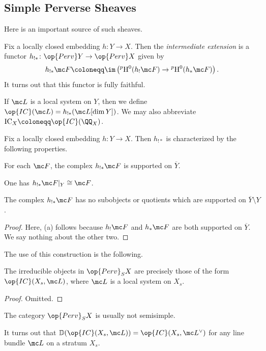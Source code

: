 \documentclass{article}
\begin{document}
\subsection{Simple Perverse Sheaves}
Here is an important source of such sheaves.
\begin{definition}
	Fix a locally closed embedding $h\colon Y\to X$. Then the \textit{intermediate extension} is a functor $h_{!*}\colon\op{Perv}Y\to\op{Perv}X$ given by
	\[h_{!*}\mc F\coloneqq\im\left({^p\mathrm H^0}(h_!\mc F)\to{^p\mathrm H^0}(h_*\mc F)\right).\]
	It turns out that this functor is fully faithful.
\end{definition}
\begin{example}
	If $\mc L$ is a local system on $Y$, then we define $\op{IC}(\mc L)=h_{!*}(\mc L[\dim Y])$. We may also abbreviate $\mathrm{IC}_X\coloneqq\op{IC}(\QQ_X)$.
\end{example}
\begin{proposition}
	Fix a locally closed embedding $h\colon Y\to X$. Then $h_{!*}$ is characterized by the following properties.
	\begin{listalph}
		\item For each $\mc F$, the complex $h_{!*}\mc F$ is supported on $\overline Y$.
		\item One has $h_{!*}\mc F|_Y\cong\mc F$.
		\item The complex $h_{!*}\mc F$ has no subobjects or quotients which are supported on $\overline Y\setminus Y$.
	\end{listalph}
\end{proposition}
\begin{proof}
	Here, (a) follows because $h_!\mc F$ and $h_*\mc F$ are both supported on $\overline Y$. We say nothing about the other two.
\end{proof}
The use of this construction is the following.
\begin{proposition}
	The irreducible objects in $\op{Perv}_SX$ are precisely those of the form $\op{IC}(X_s,\mc L)$, where $\mc L$ is a local system on $X_s$.
\end{proposition}
\begin{proof}
	Omitted.
\end{proof}
\begin{remark}
	The category $\op{Perv}_SX$ is usually not semisimple.
\end{remark}
\begin{remark}
	It turns out that $\mathbb D(\op{IC}(X_s,\mc L))=\op{IC}(X_s,\mc L^\lor)$ for any line bundle $\mc L$ on a stratum $X_s$.
\end{remark}
\end{document}
